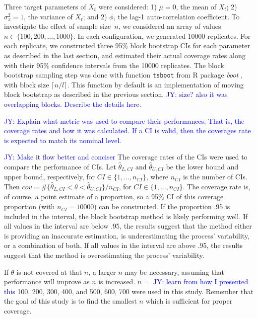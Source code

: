 \documentclass[12pt, letterpaper, titlepage]{article}
\newcommand{\jy}[1]{\textcolor{blue}{JY: #1}}
\begin{document}
Three target parameters of $X_t$ were considered:
1) $\mu = 0$, the mean of $X_t$;
2) $\sigma_x^2 = 1$, the variance of $X_t$; and
2) $\phi$, the lag-1 auto-correlation coefficient.
To investigate the effect of sample size~$n$, we considered an array of values
$n \in \{100, 200, \ldots, 1000\}$. In each configuration, we generated 10000
replicates. For each replicate, we constructed three 95\% block bootstrap
CIs for each parameter as described in the last section, and
estimated their actual coverage rates along with their 95\% confidence
intervals from the 10000 replicates. The block bootstrap sampling step was done
with function \texttt{tsboot} from R package \textsl{boot} \citep{boot}, with
block size $\lceil n / l \rceil$. This function by default is an implementation
of moving block bootstrap as described in the previous section.
\jy{size? also it was overlapping blocks. Describe the details here.}


\jy{Explain what metric was used to compare their performances. That is, the
  coverage rates and how it was calculated. If a CI is valid, then the coverages
  rate is expected to match its nominal level.}

\jy{Make it flow better and conciser}
The coverage rates of the CIs were used to compare the performance of CIs. Let
$\hat\theta_{L, CI}$ and $\hat\theta_{U, CI}$ be the lower bound and upper bound,
respectively,  for $CI \in \{1, \ldots, n_{CI}\}$, where $n_{CI}$ is the number of 
CIs.
Then $cov = \#\{\hat\theta_{L, CI} < \theta < \hat\theta_{U, CI} \}/n_{CI}$,  
for $CI \in \{1, \ldots, n_{CI}\}$.
The coverage rate is, of course, a
point estimate of a proportion, so a 95\% CI of this coverage
proportion (with $n_{CI} = 10000$) can be constructed. If the proportion
.95 is included in the interval, the block bootstrap method is likely
performing
well. If all values in the interval are below .95, the results suggest that the
method either is providing an inaccurate estimation, is underestimating the
process' variability, or a combination of both. If all values in the interval
are above .95, the results suggest that the method is overestimating the
process' variability.

If $\theta$ is not covered at that $n$, a larger $n$ may be
necessary, assuming that performance will improve as $n$ is increased. $n =$
\jy{learn from how I presented this}
100, 200, 300, 400, and 500, 600, 700 were used in this study. Remember that
the goal of this study is to find the smallest $n$ which is sufficient for
proper coverage.
\end{document}
